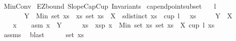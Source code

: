 %
\begin{isabellebody}%
%
%
\isadelimtheory
%
\endisadelimtheory
%
\isatagtheory
{}\isamarkupfalse%
\ MinConv\isanewline
{}\ EZ{\isacharunderscore}{\kern0pt}bound\ SlopeCapCup\ Invariants\isanewline
\isanewline
{}%
\endisatagtheory
{\isafoldtheory}%
%
\isadelimtheory
\isanewline
%
\endisadelimtheory
\isanewline
{}\isamarkupfalse%
\ cap{\isacharunderscore}{\kern0pt}endpoint{\isacharunderscore}{\kern0pt}subset{\isacharcolon}{\kern0pt}\isanewline
\ \ \ {\isachardoublequoteopen}l{\isasymge}{}{\isachardoublequoteclose}\ \isanewline
\ \ \ \ \ \ \ {\isachardoublequoteopen}Y\ {\isacharequal}{\kern0pt}\ {\isacharbraceleft}{\kern0pt}Min\ {\isacharparenleft}{\kern0pt}set\ xs{\isacharparenright}{\kern0pt}\ {\isacharbar}{\kern0pt}\ xs{\isachardot}{\kern0pt}\ set\ xs\ {\isasymsubseteq}\ X\ {\isasymand}\ sdistinct\ xs\ {\isasymand}\ cup\ {\isacharparenleft}{\kern0pt}l\ {\isacharminus}{\kern0pt}\ {}{\isacharparenright}{\kern0pt}\ {\isacharparenleft}{\kern0pt}xs{\isacharparenright}{\kern0pt}{\isacharbraceright}{\kern0pt}{\isachardoublequoteclose}\isanewline
\ \ \ \ \ {\isachardoublequoteopen}Y\ {\isasymsubseteq}\ X{\isachardoublequoteclose}\isanewline
%
\isadelimproof
%
\endisadelimproof
%
\isatagproof
{}\isamarkupfalse%
\ \ \isanewline
\ \ \isamarkupfalse%
\ x\isanewline
\ \ \isamarkupfalse%
\ asm{\isacharcolon}{\kern0pt}\ {\isachardoublequoteopen}x\ {\isasymin}\ Y{\isachardoublequoteclose}\isanewline
\ \ \isamarkupfalse%
\ \isamarkupfalse%
\ xs\ \ xsp{\isacharcolon}{\kern0pt}\ {\isachardoublequoteopen}x\ {\isacharequal}{\kern0pt}\ Min\ {\isacharparenleft}{\kern0pt}set\ xs{\isacharparenright}{\kern0pt}{\isachardoublequoteclose}\ {\isachardoublequoteopen}set\ xs\ {\isasymsubseteq}\ X{\isachardoublequoteclose}\ {\isachardoublequoteopen}cup\ {\isacharparenleft}{\kern0pt}l{\isacharminus}{\kern0pt}{}{\isacharparenright}{\kern0pt}\ {\isacharparenleft}{\kern0pt}xs{\isacharparenright}{\kern0pt}{\isachardoublequoteclose}\ \isanewline
\ \ \ \ \isamarkupfalse%
\ assms\ \isamarkupfalse%
\ blast\isanewline
\ \ \isamarkupfalse%
\ {}{\isacharcolon}{\kern0pt}\ \ {\isachardoublequoteopen}set\ xs\ {\isasymnoteq}\ {\isacharbraceleft}{\kern0pt}{\isacharbraceright}{\kern0pt}{\isachardoublequoteclose}\ \isamarkupfalse%

\end{isabellebody}
